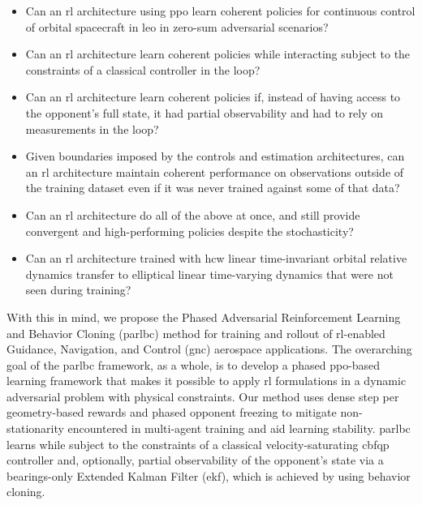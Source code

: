 \begin{itemize}
    \item Can an \acs{rl} architecture using \acs{ppo} learn coherent policies for continuous control of orbital spacecraft in \acs{leo} in zero-sum adversarial scenarios?
    \item Can an \acs{rl} architecture learn coherent policies while interacting subject to the constraints of a classical controller in the loop?
    \item Can an \acs{rl} architecture learn coherent policies if, instead of having access to the opponent's full state, it had partial observability and had to rely on measurements in the loop?
    \item Given boundaries imposed by the controls and estimation architectures, can an \acs{rl} architecture maintain coherent performance on observations outside of the training dataset even if it was never trained against some of that data?
    \item Can an \acs{rl} architecture do all of the above at once, and still provide convergent and high-performing policies despite the stochasticity?
    \item Can an \acs{rl} architecture trained with \acs{hcw} linear time-invariant orbital relative dynamics transfer to elliptical linear time-varying dynamics that were not seen during training?
\end{itemize}


With this in mind, we propose the Phased Adversarial Reinforcement Learning and Behavior Cloning (\acs{parlbc}) method for training and rollout of \acs{rl}-enabled Guidance, Navigation, and Control (\acs{gnc}) aerospace applications. The overarching goal of the \acs{parlbc} framework, as a whole, is to develop a phased \acs{ppo}-based learning framework that makes it possible to apply \acs{rl} formulations in a dynamic adversarial problem with physical constraints. Our method uses dense step per geometry-based rewards and phased opponent freezing to mitigate non-stationarity encountered in multi-agent training and aid learning stability. \acs{parlbc} learns while subject to the constraints of a classical velocity-saturating \acs{cbfqp} controller and, optionally, partial observability of the opponent's state via a bearings-only Extended Kalman Filter (\acs{ekf}), which is achieved by using behavior cloning.


